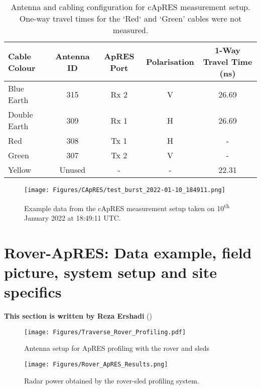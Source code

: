 \documentclass[a4paper,12pt]{article}
\begin{document}
\begin{table}[H]
  \centering
  \begin{tabular}[width=\textwidth]{l c c c c}
    \hline
    \rowcolor{gray!50}
    Cable Colour & Antenna ID & ApRES Port & Polarisation & 1-Way Travel Time (ns) \\
    \hline
    Blue Earth & 315 & Rx 2 & V & 26.69 \\
    Double Earth & 309 & Rx 1 & H & 26.69 \\
    Red & 308 & Tx 1 & H & - \\
    Green & 307 & Tx 2 & V  & - \\
    Yellow & Unused & - & - & 22.31 \\
    \hline
  \end{tabular}
  \caption{Antenna and cabling configuration for cApRES measurement setup.  
  One-way travel times for the `Red` and `Green' cables were not measured.}
  \label{TablecApRESCables}
\end{table}

\begin{figure}[h]
  \texttt{[image: Figures/CApRES/test\_burst\_2022-01-10\_184911.png]}
  \caption{Example data from the cApRES measurement setup taken on 10\textsuperscript{th}
  January 2022 at 18:49:11 UTC.}
\end{figure}
\clearpage
\pagebreak
\section{Rover-ApRES: Data example, field picture, system setup and site specifics}
\label{SecRoverApRES}
\textbf{This section is written by Reza Ershadi}
(\href{mailto:mohammadreza.ershadi@uni-tuebingen.de}{\color{blue}{Email Me}})\\
\begin{figure}[H]
	\texttt{[image: Figures/Traverse\_Rover\_Profiling.pdf]}
	\caption{Antenna setup for ApRES profiling with the rover and sleds}
	\label{fig_rover}
\end{figure}
\begin{figure}[H]
	\texttt{[image: Figures/Rover\_ApRES\_Results.png]}
	\caption{Radar power obtained by the rover-sled profiling system.}
	\label{fig_rover_res}
\end{figure}
\end{document}
